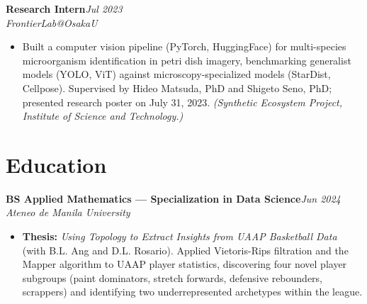 \documentclass[11pt]{article}
\newcommand{\entry}[4]{%
  \noindent\textbf{#1}\hfill\textit{#2}\\
  \textit{#3}\vspace{-2pt}
  #4
}
\begin{document}
\entry{Research Intern}{Jul 2023}{FrontierLab@OsakaU}{
\begin{itemize}
\item Built a computer vision pipeline (PyTorch, HuggingFace) for multi-species microorganism identification in petri dish imagery, benchmarking generalist models (YOLO, ViT) against microscopy-specialized models (StarDist, Cellpose). Supervised by Hideo Matsuda, PhD and Shigeto Seno, PhD; presented research poster on July 31, 2023. \textit{(Synthetic Ecosystem Project, Institute of Science and Technology.)}
\end{itemize}
}

\section*{Education}

\entry{BS Applied Mathematics --- Specialization in Data Science}{Jun 2024}{Ateneo de Manila University}{
\begin{itemize}
\item \textbf{Thesis:} \textit{Using Topology to Extract Insights from UAAP Basketball Data} (with B.L. Ang and D.L. Rosario). Applied Vietoris-Rips filtration and the Mapper algorithm to UAAP player statistics, discovering four novel player subgroups (paint dominators, stretch forwards, defensive rebounders, scrappers) and identifying two underrepresented archetypes within the league.
\end{itemize}
}
\end{document}

